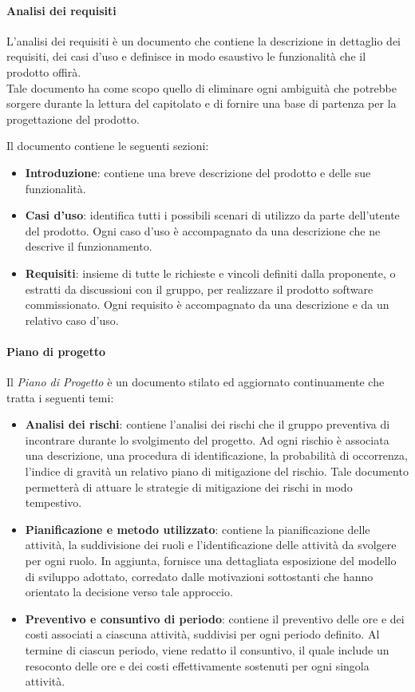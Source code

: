 \paragraph{Analisi dei requisiti}
L'analisi dei requisiti è un documento che contiene la descrizione in dettaglio dei requisiti, dei casi d'uso e definisce in modo esaustivo le funzionalità che il prodotto offirà.\\
Tale documento ha come scopo quello di eliminare ogni ambiguità che potrebbe sorgere durante la lettura del capitolato e di fornire una base di partenza per la progettazione del prodotto.

Il documento contiene le seguenti sezioni:
\begin{itemize}
    \item \textbf{Introduzione}: contiene una breve descrizione del prodotto e delle sue funzionalità.
    \item \textbf{Casi d'uso}: identifica tutti i possibili scenari di utilizzo da parte dell'utente del prodotto. Ogni caso d'uso è accompagnato da una descrizione che ne descrive il funzionamento.
    \item \textbf{Requisiti}: insieme di tutte le richieste e vincoli definiti dalla proponente, o estratti da discussioni con il gruppo, per realizzare il prodotto software commissionato. Ogni requisito è accompagnato da una descrizione e da un relativo caso d'uso.
\end{itemize}

\paragraph{Piano di progetto}
Il \textit{Piano di Progetto} è un documento stilato ed aggiornato continuamente che tratta i seguenti temi:
\begin{itemize}
    \item \textbf{Analisi dei rischi}: contiene l'analisi dei rischi che il gruppo preventiva di incontrare durante lo svolgimento del progetto. Ad ogni rischio è associata una descrizione, una procedura di identificazione, la probabilità di occorrenza, l'indice di gravità un relativo piano di mitigazione del rischio. Tale documento permetterà di attuare le strategie di mitigazione dei rischi in modo tempestivo.
    \item \textbf{Pianificazione e metodo utilizzato}: contiene la pianificazione delle attività, la suddivisione dei ruoli e l'identificazione delle attività da svolgere per ogni ruolo. In aggiunta, fornisce una dettagliata esposizione del modello di sviluppo adottato, corredato dalle motivazioni sottostanti che hanno orientato la decisione verso tale approccio.
    \item \textbf{Preventivo e consuntivo di periodo}: contiene il preventivo  delle ore e dei costi associati a ciascuna attività, suddivisi per ogni periodo definito. Al termine di ciascun periodo, viene redatto il consuntivo, il quale include un resoconto delle ore e dei costi effettivamente sostenuti per ogni singola attività.
\end{itemize}


